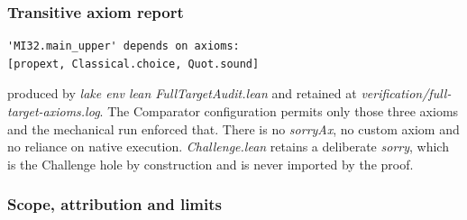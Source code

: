 \documentclass[11pt,a4paper]{article}
\begin{document}
\subsubsection{Transitive axiom report}\label{transitive-axiom-report}

\begin{verbatim}
'MI32.main_upper' depends on axioms:
[propext, Classical.choice, Quot.sound]
\end{verbatim}

produced by \textit{lake env lean FullTargetAudit.lean} and retained
at \textit{verification/full-target-axioms.log}. The Comparator
configuration permits only those three axioms and the mechanical run
enforced that. There is no \textit{sorryAx}, no custom axiom and no
reliance on native execution. \textit{Challenge.lean} retains a
deliberate \textit{sorry}, which is the Challenge hole by construction
and is never imported by the proof.

\subsubsection{Scope, attribution and
limits}\label{scope-attribution-and-limits}
\end{document}
